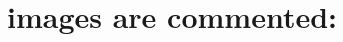 \documentclass[10pt,a4paper]{article}
\begin{document}
\section*{images are commented:}
%
%
\end{document}
